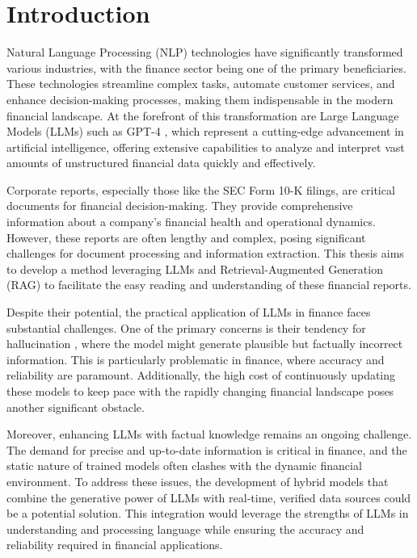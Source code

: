 \section{Introduction}
Natural Language Processing (NLP) technologies have significantly transformed various industries, with the finance sector being one of the primary beneficiaries. These technologies streamline complex tasks, automate customer services, and enhance decision-making processes, making them indispensable in the modern financial landscape. At the forefront of this transformation are Large Language Models (LLMs) such as GPT-4 \cite{OpenAI.15Mar2023}, which represent a cutting-edge advancement in artificial intelligence, offering extensive capabilities to analyze and interpret vast amounts of unstructured financial data quickly and effectively.

Corporate reports, especially those like the SEC Form 10-K \cite{SECOfficeofInvestorEducationandAdvocacy.2021} filings, are critical documents for financial decision-making. They provide comprehensive information about a company's financial health and operational dynamics. However, these reports are often lengthy and complex, posing significant challenges for document processing and information extraction. This thesis aims to develop a method leveraging LLMs and Retrieval-Augmented Generation (RAG) to facilitate the easy reading and understanding of these financial reports.

Despite their potential, the practical application of LLMs in finance faces substantial challenges. One of the primary concerns is their tendency for hallucination \cite{Huang.9Nov2023}, where the model might generate plausible but factually incorrect information. This is particularly problematic in finance, where accuracy and reliability are paramount. Additionally, the high cost of continuously updating these models to keep pace with the rapidly changing financial landscape poses another significant obstacle.

Moreover, enhancing LLMs with factual knowledge remains an ongoing challenge. The demand for precise and up-to-date information is critical in finance, and the static nature of trained models often clashes with the dynamic financial environment. To address these issues, the development of hybrid models that combine the generative power of LLMs with real-time, verified data sources could be a potential solution. This integration would leverage the strengths of LLMs in understanding and processing language while ensuring the accuracy and reliability required in financial applications.

